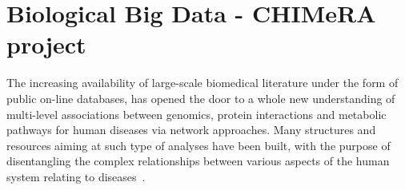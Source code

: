 \documentclass{standalone}
\begin{document}
\chapter[Big Data]{Biological Big Data - CHIMeRA project}\label{chapter3:bigdata}

The increasing availability of large-scale biomedical literature under the form of public on-line databases, has opened the door to a whole new understanding of multi-level associations between genomics, protein interactions and metabolic pathways for human diseases via network approaches.
Many structures and resources aiming at such type of analyses have been built, with the purpose of disentangling the complex relationships between various aspects of the human system relating to diseases~\cite{SymtomsNet, HumanPhenotype}.


\end{document}
